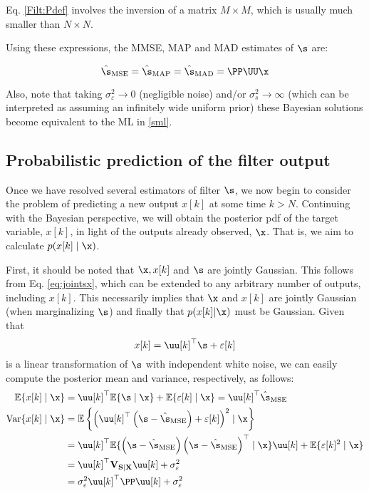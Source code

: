 Eq. \eqref{Filt:Pdef} involves the inversion of a matrix $M \times M$, which is usually much smaller than $N\times N$. 

Using these expressions, the MMSE, MAP and MAD estimates of $\s$ are:
\begin{framed}
\begin{equation}
\hat\s_\text{MSE} =\hat\s_\text{MAP} =\hat\s_\text{MAD} = \PP  \UU \x
\label{smmse}
\end{equation}
\end{framed}

Also, note that taking $\sigma_\varepsilon^2\rightarrow 0$ (negligible noise) and/or $\sigma_s^2\rightarrow\infty$ (which can be interpreted as assuming an infinitely wide uniform prior) these Bayesian solutions become equivalent to the ML in \eqref{sml}.


\subsection{Probabilistic prediction of the filter output}

Once we have resolved several estimators of filter $\s$, we now begin to consider the problem of predicting a new output $x[k]$ at some time $k>N$. Continuing with the Bayesian perspective, we will obtain the posterior pdf of the target variable, $x[k]$, in light of the outputs already observed, $\x$. That is, we aim to calculate $p (x[k] \mid \x)$.

First, it should be noted that $\x, x[k]$ and $\s$ are jointly Gaussian. This follows from Eq. \eqref{eq:jointsx}, which can be extended to any arbitrary number of outputs, including $x[k]$. This necessarily implies that $\x$ and $x[k]$ are jointly Gaussian (when marginalizing $\s$) and finally that $p(x[k] | \x) $ must be Gaussian. Given that
\begin{equation}
x[k] = \uu[k]^\top\s+\varepsilon[k]
\end{equation}
is a linear transformation of $\s$ with independent white noise, we can easily compute the posterior mean and variance, respectively, as follows:
\begin{align}
\EE\{x[k]\mid \x\} &= \uu[k]^\top\EE\{\s\mid \x\} + \EE\{\varepsilon[k] \mid\x\}
                    = \uu[k]^\top\hat\s_\text{MSE}   \\
\text{Var}\{x[k] \mid \x\} 
	&= \EE\left\{\left(\uu[k]^\top \left(\s-\hat\s_\text{MSE}\right) 
	             + \varepsilon[k] \right)^2 \mid\x \right\}   \nonumber\\
    &= \uu[k]^\top \EE\{\left(\s-\hat\s_\text{MSE}\right)\left(\s-\hat\s_\text{MSE}\right)^\top 
                        \mid \x\} \uu[k]
       + \EE\{\varepsilon[k]^2 \mid\x\}    \nonumber\\
    &= \uu[k]^\top {\bf V}_{{\bf S}|{\bf X}} \uu[k] + \sigma_\varepsilon^2   \nonumber\\
    &= \sigma_\varepsilon^2 \uu[k]^\top \PP \uu[k] + \sigma_\varepsilon^2
\end{align}

